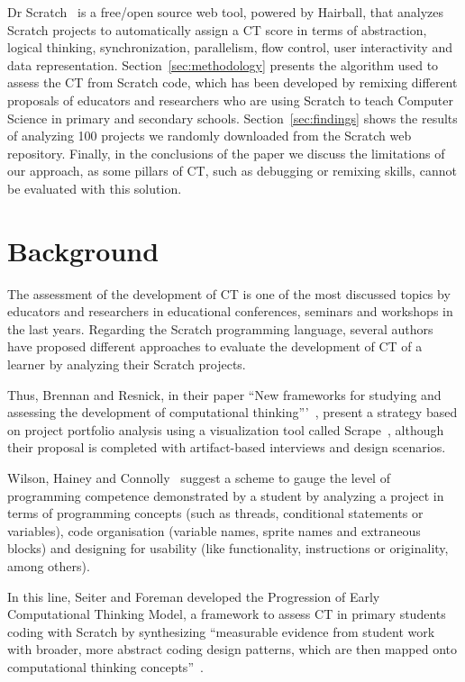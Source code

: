 \documentclass[a4paper,11pt]{article}
\begin{document}
Dr Scratch~\cite{moreno2014drscratch} is a free/open source web tool, powered by Hairball, that analyzes Scratch projects to automatically assign a CT score in terms of abstraction, logical thinking, synchronization, parallelism, flow control, user interactivity and data representation. Section~\ref{sec:methodology} presents the algorithm used to assess the CT from Scratch code, which has been developed by remixing different proposals of educators and researchers who are using Scratch to teach Computer Science in primary and secondary schools.
Section~\ref{sec:findings} shows the results of analyzing 100 projects we randomly downloaded from the Scratch web repository. Finally, in the conclusions of the paper we discuss the limitations of our approach, as some pillars of CT, such as debugging or remixing skills, cannot be evaluated with this solution.


\section{Background}
\label{sec:background}

The assessment of the development of CT is one of the most discussed topics by educators and researchers in educational conferences, seminars and workshops in the last years. Regarding the Scratch programming language, several authors have proposed different approaches to evaluate the development of CT of a learner by analyzing their Scratch projects. 

Thus, Brennan and Resnick, in their paper ``New frameworks for studying and assessing the development of computational thinking'''~\cite{brennan2012new}, present a strategy based on project portfolio analysis using a visualization tool called Scrape~\cite{wolz2011scrape}, although their proposal is completed with artifact-based interviews and design scenarios.

Wilson, Hainey and Connolly~\cite{wilson2012evaluation} suggest a scheme to gauge the level of programming competence demonstrated by a student by analyzing a project in terms of programming concepts (such as threads, conditional statements or variables), code organisation (variable names, sprite names and extraneous blocks) and designing for usability (like functionality, instructions or originality, among others).

In this line, Seiter and Foreman developed the Progression of Early Computational Thinking Model, a framework to assess CT in primary students coding with Scratch by synthesizing ``measurable evidence from student work with broader, more abstract coding design patterns, which are then mapped onto computational thinking concepts''~\cite{seiter2013modeling}.
\end{document}
